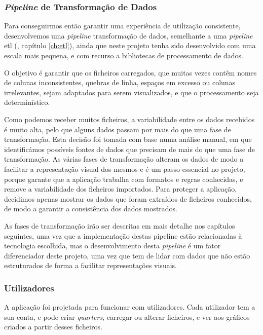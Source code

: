 \subsubsection{\textit{Pipeline} de Transformação de Dados}

Para conseguirmos então garantir uma experiência de utilização consistente, desenvolvemos uma \textit{pipeline} transformação de dados, semelhante a uma \textit{pipeline} \gls{etl} (\cf, capítulo \ref{ch:etl}), ainda que neste projeto tenha sido desenvolvido com uma escala mais pequena, e com recurso a bibliotecas de processamento de dados. 

O objetivo é garantir que os ficheiros carregados, que muitas vezes contêm nomes de colunas inconsistentes, quebras de linha, espaços em excesso ou colunas irrelevantes, sejam adaptados para serem visualizados, e que o processamento seja determinístico.

Como podemos receber muitos ficheiros, a variabilidade entre os dados recebidos é muito alta, pelo que alguns dados passam por mais do que uma fase de transformação. Esta decisão foi tomada com base numa análise manual, em que identificámos possíveis fontes de dados que precisam de mais do que uma fase de transformação. As várias fases de transformação alteram os dados de modo a facilitar a representação visual dos mesmos e é um passo essencial no projeto, porque garante que a aplicação trabalha com formatos e regras conhecidas, e remove a variabilidade dos ficheiros importados. Para proteger a aplicação, decidimos apenas mostrar os dados que foram extraídos de ficheiros conhecidos, de modo a garantir a consistência dos dados mostrados.

As fases de transformação irão ser descritas em mais detalhe nos capítulos seguintes, uma vez que a implementação destas pipeline estão relacionadas à tecnologia escolhida, mas o desenvolvimento desta \textit{pipeline} é um fator diferenciador deste projeto, uma vez que tem de lidar com dados que não estão estruturados de forma a facilitar representações visuais. 

\subsubsection{Utilizadores}

A aplicação foi projetada para funcionar com utilizadores. Cada utilizador tem a sua conta, e pode criar \textit{quarters}, carregar ou alterar ficheiros, e ver aos gráficos criados a partir desses ficheiros.

